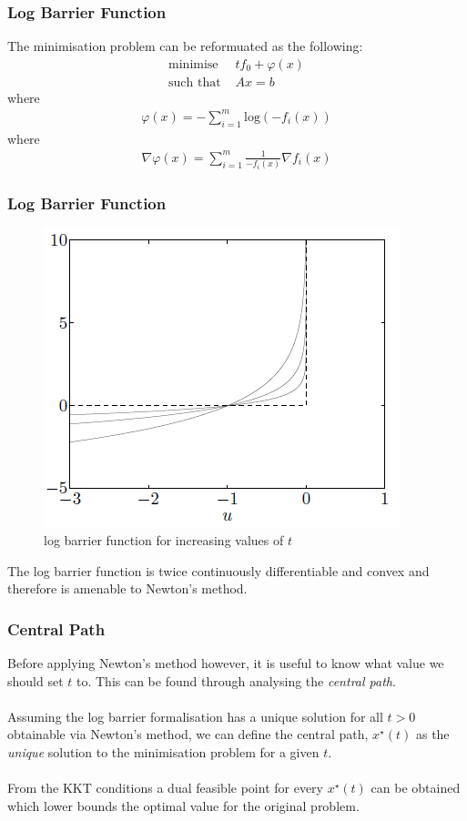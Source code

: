 \documentclass{beamer}
\begin{document}
\begin{frame}
    \frametitle{Log Barrier Function}
    The minimisation problem can be reformuated as the following:
    \begin{align*}
        \text{minimise } \, &t f_{0} +
        \varphi(x)\\
        \text{such that } & Ax =b
    \end{align*}
    where
    \begin{align*}
        \varphi(x) = - \sum\limits_{i=1}^{m}\text{log}(-f_{i}(x))
    \end{align*}
    where
    \begin{align*}
        \nabla \varphi(x) = \sum\limits_{i=1}^{m}\frac{1}{-f_{i}(x)}\nabla f_{i}(x)
    \end{align*}
\end{frame}

\begin{frame}
    \frametitle{Log Barrier Function}
    \begin{figure}[t]
        \centering
        \includegraphics[scale=0.6]{barrier_function}
        \caption{log barrier function for increasing values of $t$}
        \label{fig:logbar}
    \end{figure}
    The log barrier function is twice continuously differentiable and convex
    and therefore is amenable to Newton's method.
\end{frame}


\begin{frame}
    \frametitle{Central Path}
    Before applying Newton's method however, it is useful to know what value we
    should set $t$ to. This can be found through analysing the \textit{central
    path}.
    \\~\\
    Assuming the log barrier formalisation has a unique solution for all
    $t > 0$ obtainable via Newton's method, we can define the central path,
    $x^{\star}(t)$ as the \textit{unique} solution to the minimisation problem for a given
    $t$.
    \\~\\
    From the KKT conditions a dual feasible point for every
    $x^{\star}(t)$ can be obtained which lower bounds the optimal value for
    the original problem.
\end{frame}
\end{document}
